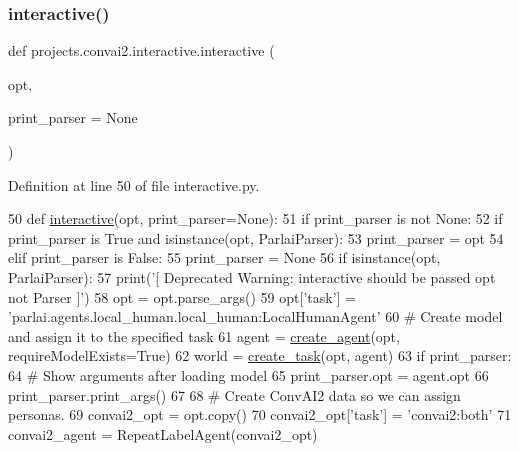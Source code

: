\subsubsection{\texorpdfstring{interactive()}{interactive()}}
{\footnotesize\ttfamily def projects.\+convai2.\+interactive.\+interactive (\begin{DoxyParamCaption}\item[{}]{opt,  }\item[{}]{print\+\_\+parser = {\ttfamily None} }\end{DoxyParamCaption})}



Definition at line 50 of file interactive.\+py.


\begin{DoxyCode}
50 \textcolor{keyword}{def }\hyperlink{namespaceprojects_1_1self__feeding_1_1interactive_aaebd4c577ab0371c73e8442be469ebab}{interactive}(opt, print\_parser=None):
51     \textcolor{keywordflow}{if} print\_parser \textcolor{keywordflow}{is} \textcolor{keywordflow}{not} \textcolor{keywordtype}{None}:
52         \textcolor{keywordflow}{if} print\_parser \textcolor{keywordflow}{is} \textcolor{keyword}{True} \textcolor{keywordflow}{and} isinstance(opt, ParlaiParser):
53             print\_parser = opt
54         \textcolor{keywordflow}{elif} print\_parser \textcolor{keywordflow}{is} \textcolor{keyword}{False}:
55             print\_parser = \textcolor{keywordtype}{None}
56     \textcolor{keywordflow}{if} isinstance(opt, ParlaiParser):
57         print(\textcolor{stringliteral}{'[ Deprecated Warning: interactive should be passed opt not Parser ]'})
58         opt = opt.parse\_args()
59     opt[\textcolor{stringliteral}{'task'}] = \textcolor{stringliteral}{'parlai.agents.local\_human.local\_human:LocalHumanAgent'}
60     \textcolor{comment}{# Create model and assign it to the specified task}
61     agent = \hyperlink{namespaceparlai_1_1core_1_1agents_a00d77a7e26fb89e8bd900f7b2a02982a}{create\_agent}(opt, requireModelExists=\textcolor{keyword}{True})
62     world = \hyperlink{namespaceparlai_1_1core_1_1worlds_a79969c7ba76d4b3c500f5bb776444dc6}{create\_task}(opt, agent)
63     \textcolor{keywordflow}{if} print\_parser:
64         \textcolor{comment}{# Show arguments after loading model}
65         print\_parser.opt = agent.opt
66         print\_parser.print\_args()
67 
68     \textcolor{comment}{# Create ConvAI2 data so we can assign personas.}
69     convai2\_opt = opt.copy()
70     convai2\_opt[\textcolor{stringliteral}{'task'}] = \textcolor{stringliteral}{'convai2:both'}
71     convai2\_agent = RepeatLabelAgent(convai2\_opt)

\end{DoxyCode}
